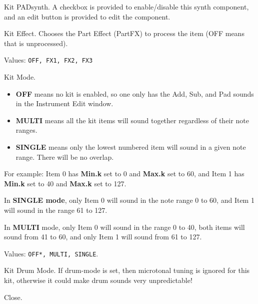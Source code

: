    Kit PADsynth.
   A checkbox is provided to enable/disable this synth component, and
   an edit button is provided to edit the component.

   Kit Effect.
   Chooses the Part Effect (PartFX) to process the item (OFF means that is
   unprocessed). 

   Values: \texttt{OFF, FX1, FX2, FX3}

   Kit Mode.

   \begin{itemize}
      \item \textbf{OFF} means no kit is enabled, so one only has the Add,
         Sub, and Pad sounds in the Instrument Edit window.
      \item \textbf{MULTI} means all the kit items will sound together
         regardless of their note ranges.
      \item \textbf{SINGLE} means only the lowest numbered item will sound
         in a given note range. There will be no overlap.
   \end{itemize}

   For example:
   Item 0 has \textbf{Min.k} set to 0 and \textbf{Max.k} set to 60, and
   Item 1 has \textbf{Min.k} set to 40 and \textbf{Max.k} set to 127.

   In \textbf{SINGLE mode}, only Item 0 will sound in the note range 0 to
   60, and Item 1 will sound in the range 61 to 127.

   In \textbf{MULTI} mode, only Item 0 will sound in the range 0 to 40, both
   items will sound from 41 to 60, and only Item 1 will sound from 61 to
   127.

   Values: \texttt{OFF*, MULTI, SINGLE}.

   Kit Drum Mode.
   If drum-mode  is set, then microtonal tuning is ignored for this kit,
   otherwise it could make drum sounds very unpredictable!

   Close.


